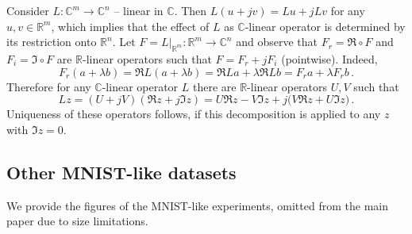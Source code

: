\documentclass[a4paper,10pt]{article}
\newcommand{\real}{\mathbb{R}}
\newcommand{\cplx}{\mathbb{C}}
\begin{document}
Consider $L \colon \cplx^m \to \cplx^n$ -- linear in $\cplx$. Then $
  L(u + jv) = L u + j L v
$ for any $u, v \in \real^m$, which implies that the effect of $L$ as $\cplx$-linear
operator is determined by its restriction onto $\real^n$. Let $
  F = L\vert_{\real^m}
  \colon \real^m \to \cplx^n
$ and observe that $F_r = \Re \circ F$ and $F_i = \Im \circ F$ are $\real$-linear operators
such that $F = F_r + j F_i$ (pointwise). Indeed,
$$
  F_r(a + \lambda b)
  = \Re L(a + \lambda b)
  = \Re L a + \lambda \Re L b
  = F_r a + \lambda F_r b
  \,. $$
Therefore for any $\cplx$-linear operator $L$ there are $\real$-linear operators $U, V$
such that
$$
L z 
  = (U + j V) (\Re z + j \Im z)
  = U \Re z - V \Im z + j \bigl( V \Re z + U \Im z \bigr)
  \,. $$
Uniqueness of these operators follows, if this decomposition is applied to any $z$ with
$\Im z = 0$.


\subsection{Other MNIST-like datasets} %
\label{sub:other_mnist_like_datasets}

We provide the figures of the MNIST-like experiments, omitted from the main paper
due to size limitations.
\end{document}
